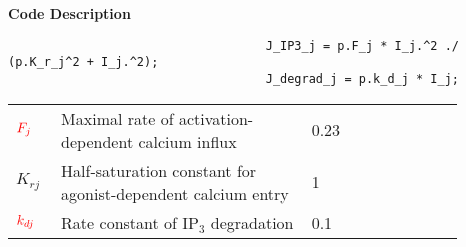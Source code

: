 \documentclass[fleqn]{report}
\numberwithin{equation}{section}
\numberwithin{equation}{section}
\begin{document}
 									\textbf{Code Description}
 									\begin{verbatim}
 									J_IP3_j = p.F_j * I_j.^2 ./ (p.K_r_j^2 + I_j.^2);
 									J_degrad_j = p.k_d_j * I_j;
 									\end{verbatim}
 									\begin{table}[h!]
 									\centering
 									\begin{tabular}{ p{0.09\linewidth}  >{\footnotesize} p{0.5\linewidth}  >{\footnotesize} p{0.27\linewidth} >{\footnotesize} p{0.03\linewidth} }
 									\hline
 									 $\textcolor{red}{F_{j}}$      			& Maximal rate of activation-dependent calcium influx			& 0.23 \uMps	& \cite{Koenigsberger2006} \\
 									$K_{rj}$				& Half-saturation constant for agonist-dependent calcium entry	& 1 \uM	 & \cite{Koenigsberger2006} \\
 										$\textcolor{red}{k_{dj}}$      			& Rate constant of IP$_{3}$ degradation						 		& 0.1 \pers		& \cite{Koenigsberger2006} \\
 									\hline
 									\end{tabular}
 									\label{tab:IP3j}
 									\end{table}
\end{document}
